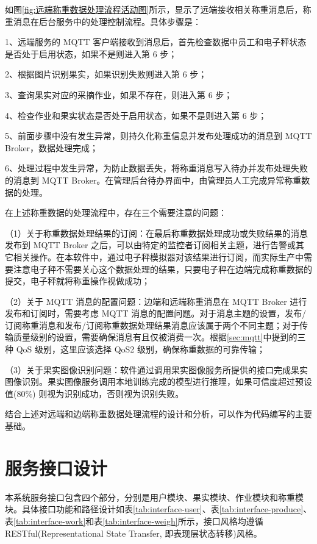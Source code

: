 如图\ref{fig:远端称重数据处理流程活动图}所示，显示了远端接收相关称重消息后，称重消息在后台服务中的处理控制流程。具体步骤是：

1、远端服务的 MQTT 客户端接收到消息后，首先检查数据中员工和电子秤状态是否处于启用状态，如果不是则进入第 6 步；

2、根据图片识别果实，如果识别失败则进入第 6 步；

3、查询果实对应的采摘作业，如果不存在，则进入第 6 步；

4、检查作业和果实状态是否处于启用状态，如果不是则进入第 6 步；

5、前面步骤中没有发生异常，则持久化称重信息并发布处理成功的消息到 MQTT Broker，数据处理完成；

6、处理过程中发生异常，为防止数据丢失，将称重消息写入待办并发布处理失败的消息到 MQTT Broker。在管理后台待办界面中，由管理员人工完成异常称重数据的处理。

在上述称重数据的处理流程中，存在三个需要注意的问题：

（1）关于称重数据处理结果的订阅：在最后称重数据处理成功或失败结果的消息发布到 MQTT Broker 之后，可以由特定的监控者订阅相关主题，进行告警或其它相关操作。在本软件中，通过电子秤模拟器对该结果进行订阅，而实际生产中需要注意电子秤不需要关心这个数据处理的结果，只要电子秤在边端完成称重数据的提交，电子秤就将称重操作视做成功；

（2）关于 MQTT 消息的配置问题：边端和远端称重消息在 MQTT Broker 进行发布和订阅时，需要考虑 MQTT 消息的配置问题。对于消息主题的设置，发布/订阅称重消息和发布/订阅称重数据处理结果消息应该属于两个不同主题；对于传输质量级别的设置，需要确保消息有且仅被消费一次。根据\ref{sec:mqtt}中提到的三种 QoS 级别，这里应该选择 QoS2 级别，确保称重数据的可靠传输；

（3）关于果实图像识别问题：软件通过调用果实图像服务所提供的接口完成果实图像识别。果实图像服务调用本地训练完成的模型进行推理，如果可信度超过预设值(80\%) 则视为识别成功，否则视为识别失败。

结合上述对远端和边端称重数据处理流程的设计和分析，可以作为代码编写的主要基础。

\section{服务接口设计}\label{sec:service}

本系统服务接口包含四个部分，分别是用户模块、果实模块、作业模块和称重模块。具体接口功能和路径设计如表\ref{tab:interface-user}、表\ref{tab:interface-produce}、表\ref{tab:interface-work}和表\ref{tab:interface-weigh}所示，接口风格均遵循 RESTful(Representational State Transfer, 即表现层状态转移)风格。

